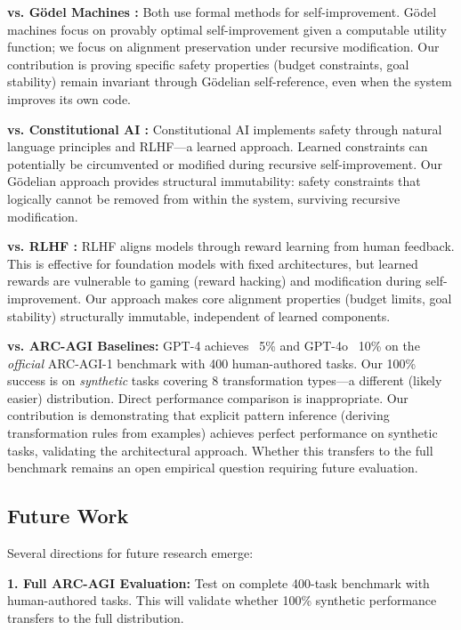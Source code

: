 \documentclass[11pt,letterpaper]{article}
\begin{document}
\textbf{vs. Gödel Machines \cite{schmidhuber2007}:} Both use formal methods for self-improvement. Gödel machines focus on provably optimal self-improvement given a computable utility function; we focus on alignment preservation under recursive modification. Our contribution is proving specific safety properties (budget constraints, goal stability) remain invariant through Gödelian self-reference, even when the system improves its own code.

\textbf{vs. Constitutional AI \cite{bai2022}:} Constitutional AI implements safety through natural language principles and RLHF—a learned approach. Learned constraints can potentially be circumvented or modified during recursive self-improvement. Our Gödelian approach provides structural immutability: safety constraints that logically cannot be removed from within the system, surviving recursive modification.

\textbf{vs. RLHF \cite{christiano2017}:} RLHF aligns models through reward learning from human feedback. This is effective for foundation models with fixed architectures, but learned rewards are vulnerable to gaming (reward hacking) and modification during self-improvement. Our approach makes core alignment properties (budget limits, goal stability) structurally immutable, independent of learned components.

\textbf{vs. ARC-AGI Baselines:} GPT-4 achieves ~5\% and GPT-4o ~10\% on the \textit{official} ARC-AGI-1 benchmark with 400 human-authored tasks. Our 100\% success is on \textit{synthetic} tasks covering 8 transformation types—a different (likely easier) distribution. Direct performance comparison is inappropriate. Our contribution is demonstrating that explicit pattern inference (deriving transformation rules from examples) achieves perfect performance on synthetic tasks, validating the architectural approach. Whether this transfers to the full benchmark remains an open empirical question requiring future evaluation.

\subsection{Future Work}

Several directions for future research emerge:

\textbf{1. Full ARC-AGI Evaluation:} Test on complete 400-task benchmark with human-authored tasks. This will validate whether 100\% synthetic performance transfers to the full distribution.
\end{document}
